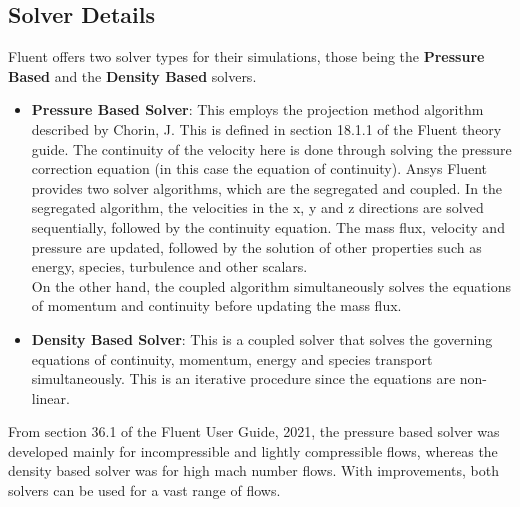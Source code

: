 \documentclass[11pt,a4paper,twoside,oneside]{article}
\begin{document}
\clearpage
\subsection{Solver Details}
\vspace{0.3cm}
Fluent offers two solver types for their simulations, those being the \textbf{Pressure Based} and the \textbf{Density Based} solvers.
\begin{itemize}
    \item \textbf{Pressure Based Solver}: This employs the projection method algorithm described by Chorin, J\cite{chorin}. This is defined in section 18.1.1 of the Fluent theory guide\cite{fluth}. The continuity of the velocity here is done through solving the pressure correction equation (in this case the equation of continuity). Ansys Fluent provides two solver algorithms, which are the segregated and coupled. In the segregated algorithm, the velocities in the x, y and z directions are solved sequentially, followed by the continuity equation. The mass flux, velocity and pressure are updated, followed by the solution of other properties such as energy, species, turbulence and other scalars.\\
    On the other hand, the coupled algorithm simultaneously solves the equations of momentum and continuity before updating the mass flux.%

    \item \textbf{Density Based Solver}: This is a coupled solver that solves the governing equations of continuity, momentum, energy and species transport simultaneously. This is an iterative procedure since the equations are non-linear.
\end{itemize}
From section 36.1 of the Fluent User Guide, 2021\cite{flug}, the pressure based solver was developed mainly for incompressible and lightly compressible flows, whereas the density based solver was for high mach number flows. With improvements, both solvers can be used for a vast range of flows.
\end{document}
